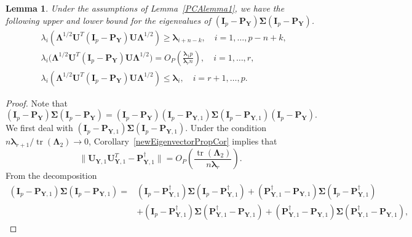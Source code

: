 \documentclass[12pt]{article} %
\DeclareMathOperator{\mytr}{tr}
\newcommand{\bP}{\mathbf{P}}
\newcommand{\bY}{\mathbf{Y}}
\newcommand{\bI}{\mathbf{I}}
\newcommand{\bU}{\mathbf{U}}
\newcommand{\bfsym}[1]{\ensuremath{\boldsymbol{#1}}}
\def\blambda {\bfsym {\lambda}}
\def\bLambda {\bfsym {\Lambda}}
\def\bSigma {\bfsym {\Sigma}}
\newtheorem{lemma}{Lemma}
\theoremstyle{definition}
\begin{document}
\begin{appendices}
\begin{lemma}\label{gg:Lemma1}
    Under the assumptions of Lemma~\ref{PCAlemma1},
    we have the following upper and lower bound for the eigenvalues of $(\bI_p-\bP_{\bY})\bSigma (\bI_p-\bP_{\bY})$.
    \begin{align}
        &\lambda_i (\bLambda^{1/2}\bU^T (\bI_p-\bP_{\bY})\bU\bLambda^{1/2})\geq
        \blambda_{i+n-k},\quad 
        \text{$i=1,\ldots, p-n+k$},
        \label{eq:mybound2}\\
        &\lambda_i\big(\bLambda^{1/2}\bU^T (\bI_p-\bP_{\bY})\bU\bLambda^{1/2}\big)= O_P(\frac{\blambda_1 p}{\blambda_r n}),\quad
        \text{$i=1,\ldots, r$},\label{eq:mybound3}\\
        &\lambda_i (\bLambda^{1/2}\bU^T (\bI_p-\bP_{\bY})\bU\bLambda^{1/2})\leq
        \blambda_i, \quad 
        \text{$i=r+1,\ldots, p$}.\label{eq:mybound1}
    \end{align}
\end{lemma}
\begin{proof}
    Note that
    \begin{equation*}
         (\bI_p-\bP_{\bY})\bSigma (\bI_p-\bP_{\bY})
         =
         (\bI_p-\bP_{\bY})
         (\bI_p-\bP_{\bY,1})
         \bSigma 
         (\bI_p-\bP_{\bY,1})
         (\bI_p-\bP_{\bY}).
    \end{equation*}
We first deal with
    $
         (\bI_p-\bP_{\bY,1})
         \bSigma 
         (\bI_p-\bP_{\bY,1})
         $.
Under the condition $n\blambda_{r+1}/\mytr(\bLambda_2)\to 0$, Corollary~\ref{newEigenvectorPropCor} implies that
\begin{equation*}\label{rain1}
        \|\bU_{\bY,1}\bU_{\bY,1}^T - 
\bP^\dagger_{\bY,1}
        \|
    =O_P\left(\frac{\mytr(\bLambda_2)}{n\blambda_r}\right).
\end{equation*}
    From the decomposition
         \begin{equation*}
         \begin{split}
         (\bI_p-\bP_{\bY,1})
         \bSigma 
         (\bI_p-\bP_{\bY,1})
         =&
         (\bI_p-\bP_{\bY,1}^{\dagger})
         \bSigma 
         (\bI_p-\bP_{\bY,1}^{\dagger})
         +
         (\bP_{\bY,1}^{\dagger}-\bP_{\bY,1})
         \bSigma 
         (\bI_p-\bP_{\bY,1}^{\dagger})
         \\
         &+
         (\bI_p-\bP_{\bY,1}^{\dagger})
         \bSigma 
         (\bP_{\bY,1}^{\dagger}-\bP_{\bY,1})
         +
         (\bP_{\bY,1}^{\dagger}-\bP_{\bY,1})
         \bSigma 
         (\bP_{\bY,1}^{\dagger}-\bP_{\bY,1}),

\end{split}
\end{equation*}
\end{proof}
\end{appendices}
\end{document}

